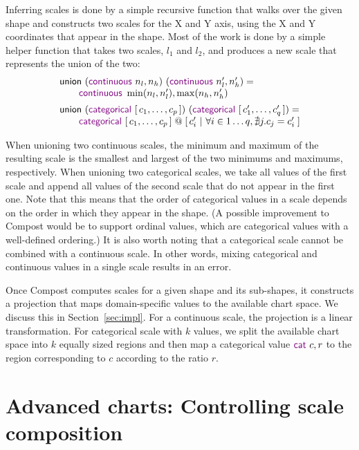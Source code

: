 \documentclass{jfp}
\newcommand{\ident}[1]{\textnormal{\textcolor{idclr}{\sffamily #1}}}
\newcommand{\kvd}[1]{\textnormal{\textcolor{kvdclr}{\sffamily #1}}}
\begin{document}
Inferring scales is done by a simple recursive function that walks over the given shape and
constructs two scales for the X and Y axis, using the X and Y coordinates that appear in the shape.
Most of the work is done by a simple helper function that takes two scales, $l_1$ and $l_2$,
and produces a new scale that represents the union of the two:
%
\begin{equation*}
\begin{array}{l}
\ident{union}~(\kvd{continuous}~n_l, n_h)~(\kvd{continuous}~n'_l, n'_h) =\\
\qquad\kvd{continuous}~\min(n_l, n'_l), \max(n_h, n'_h)\\[0.5em]
\ident{union}~(\kvd{categorical}~[\,c_1, \ldots, c_p\,])~(\kvd{categorical}~[\,c'_1, \ldots, c'_q\,]) =\\
\qquad \kvd{categorical}~[\,c_1, \ldots, c_p\,] \;@\; [\,c'_i~|~ \forall i\in 1\ldots q, \nexists j. c_j = c'_i \;]
\end{array}
\end{equation*}

\vspace{-0.5em}
\noindent
When unioning two continuous scales, the minimum and maximum of the resulting scale is the smallest
and largest of the two minimums and maximums, respectively. When unioning two categorical scales,
we take all values of the first scale and append all values of the second scale that do not appear
in the first one. Note that this means that the order of categorical values in a scale depends on
the order in which they appear in the shape. (A possible improvement to Compost would be to support
ordinal values, which are categorical values with a well-defined ordering.) It is also worth noting
that a categorical scale cannot be combined with a continuous scale. In other words, mixing
categorical and continuous values in a single scale results in an error.

Once Compost computes scales for a given shape and its sub-shapes, it constructs a projection
that maps domain-specific values to the available chart space. We discuss this in
Section~\ref{sec:impl}. For a continuous scale, the projection is a linear transformation. For
categorical scale with $k$ values, we split the available chart space into $k$ equally sized
regions and then map a categorical value $\kvd{cat}~c, r$ to the region corresponding to $c$
according to the ratio $r$.

\section{Advanced charts: Controlling scale composition}
\label{sec:fancy}
\end{document}
